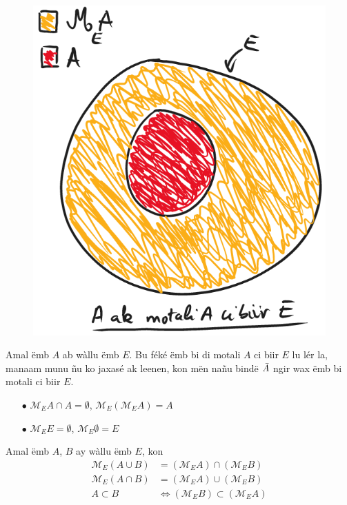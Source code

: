 \documentclass[twoside, a4paper]{article}
\begin{document}
\begin{figure}[ht]
  \centering
  \includegraphics[scale = 0.5]{image/motali_emb.png}
  \label{fig:motali_emb}
\end{figure}
\begin{tcolorbox}[enhanced jigsaw,breakable,pad at break*=1mm, colback=orange!5!white,colframe=white!75!black,title= Seetlu,
    watermark color=white]
  Amal ëmb $A$ ab wàllu ëmb $E$. Bu féké ëmb bi di motali $A$ ci biir $E$ lu lér la, manaam munu ñu ko jaxasé ak leenen, kon mën nañu bindë $\Bar{A}$ ngir wax ëmb bi motali ci biir $E$.

  \begin{itemize}
    \item[$\bullet$] $\mathcal{M}_{E}A \cap A = \emptyset$, $\mathcal{M}_{E}(\mathcal{M}_{E}A) = A$
    \item[$\bullet$] $\mathcal{M}_{E}E = \emptyset$, $\mathcal{M}_{E}\emptyset = E$
  \end{itemize}
\end{tcolorbox}
\begin{tcolorbox}[enhanced jigsaw,breakable,pad at break*=1mm, colback=blue!5!white,colframe=white!75!black,title= Tèg\footnote{Proposition},
    watermark color=white]
  Amal ëmb $A$, $B$ ay wàllu ëmb $E$, kon
  \begin{align*}
    \mathcal{M}_{E}(A \cup B) & = (\mathcal{M}_{E}A) \cap (\mathcal{M}_{E}B)       \\
    \mathcal{M}_{E}(A \cap B) & = (\mathcal{M}_{E}A) \cup (\mathcal{M}_{E}B)       \\
    A \subset B               & \iff (\mathcal{M}_{E}B) \subset (\mathcal{M}_{E}A) \\
  \end{align*}
\end{tcolorbox}
\end{document}
